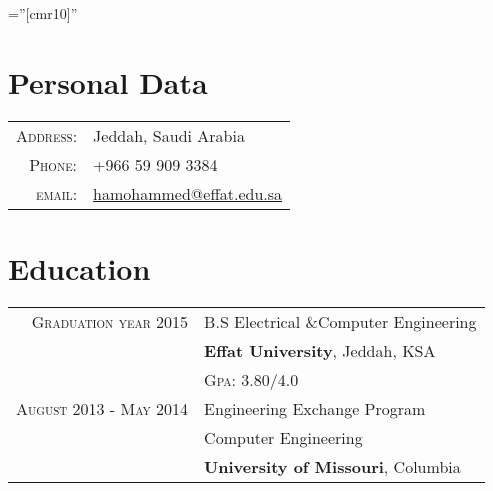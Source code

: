 \documentclass[a4paper,10pt]{article} %
\begin{document}
\pagestyle{empty} %

\font\fb=''[cmr10]'' %


\par{\bigskip\par} %

\section{Personal Data}

\begin{tabular}{rl}
\textsc{Address:} & Jeddah, Saudi Arabia \\
\textsc{Phone:} & +966 59 909 3384\\
\textsc{email:} & \href{mailto:hamohammed@effat.edu.sa}{hamohammed@effat.edu.sa}
\end{tabular}




\section{Education}

\begin{tabular}{rl}	
\textsc{Graduation year} 2015 & B.S Electrical \&Computer Engineering \\
&\textbf{Effat University}, Jeddah, KSA\\
&\normalsize \textsc{Gpa}: 3.80/4.0\\


\textsc{August} 2013 - \textsc{May} 2014& Engineering Exchange Program\\
& {Computer Engineering}\\
& \textbf{University of Missouri}, Columbia\\

 \end{tabular}
\end{document}
